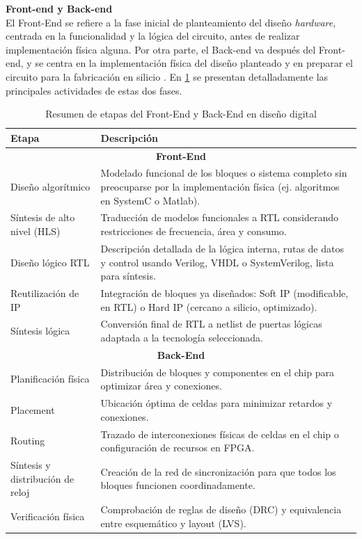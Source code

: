 \vspace{0.4em} %

\begin{adjustwidth}{1.5cm}{}
\textbf{Front-end y Back-end} \vspace{0.25cm} \\
El Front-End se refiere a la fase inicial de planteamiento del diseño \textit{hardware}, centrada en la funcionalidad y la lógica del circuito, antes de realizar implementación física alguna. Por otra parte, el Back-end va después del Front-end, y se centra en la implementación física del diseño planteado y en preparar el circuito para la fabricación en silicio \cite{metodologiaFernando}. En \ref{tbl:frontBack} se presentan detalladamente las principales actividades de estas dos fases.

\begin{table}[h!]
\centering
\begin{tabular}{|l|p{9cm}|}
\hline
\textbf{Etapa} & \textbf{Descripción} \\ \hline
\multicolumn{2}{|c|}{\textbf{Front-End}} \\ \hline
Diseño algorítmico & Modelado funcional de los bloques o sistema completo sin preocuparse por la implementación física (ej. algoritmos en SystemC o Matlab). \\ \hline
Síntesis de alto nivel (HLS) & Traducción de modelos funcionales a RTL considerando restricciones de frecuencia, área y consumo. \\ \hline
Diseño lógico RTL & Descripción detallada de la lógica interna, rutas de datos y control usando Verilog, VHDL o SystemVerilog, lista para síntesis. \\ \hline
Reutilización de IP & Integración de bloques ya diseñados: Soft IP (modificable, en RTL) o Hard IP (cercano a silicio, optimizado). \\ \hline
Síntesis lógica & Conversión final de RTL a netlist de puertas lógicas adaptada a la tecnología seleccionada. \\ \hline
\multicolumn{2}{|c|}{\textbf{Back-End}} \\ \hline
Planificación física & Distribución de bloques y componentes en el chip para optimizar área y conexiones. \\ \hline
Placement & Ubicación óptima de celdas para minimizar retardos y conexiones. \\ \hline
Routing & Trazado de interconexiones físicas de celdas en el chip o configuración de recursos en FPGA. \\ \hline
Síntesis y distribución de reloj & Creación de la red de sincronización para que todos los bloques funcionen coordinadamente. \\ \hline
Verificación física & Comprobación de reglas de diseño (DRC) y equivalencia entre esquemático y layout (LVS). \\ \hline
\end{tabular}
\caption{Resumen de etapas del Front-End y Back-End en diseño digital}
\label{tbl:frontBack}
\end{table}
\end{adjustwidth}


